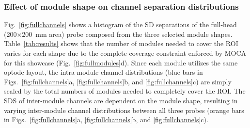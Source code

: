 \subsubsection{Effect of module shape on channel separation distributions}
Fig.~\ref{fig:fullchannels} shows a histogram of the \ac{SD} separations of the full-head (200$\times$200~mm area) probe composed from the three selected module shapes. Table~\ref{tab:results} shows that the number of modules needed to cover the \ac{ROI} varies for each shape due to the complete coverage constraint enforced by \ac{MOCA} for this showcase (Fig.~\ref{fig:fullmodules}d). Since each module utilizes the same optode layout, the intra-module channel distributions (blue bars in Figs.~\ref{fig:fullchannels}a, \ref{fig:fullchannels}b, and \ref{fig:fullchannels}c) are simply scaled by the total numbers of modules needed to completely cover the \ac{ROI}. The \ac{SDS} of inter-module channels are dependent on the module shape, resulting in varying inter-module channel distributions between all three probes (orange bars in Figs.~\ref{fig:fullchannels}a, \ref{fig:fullchannels}b, and \ref{fig:fullchannels}c). 

